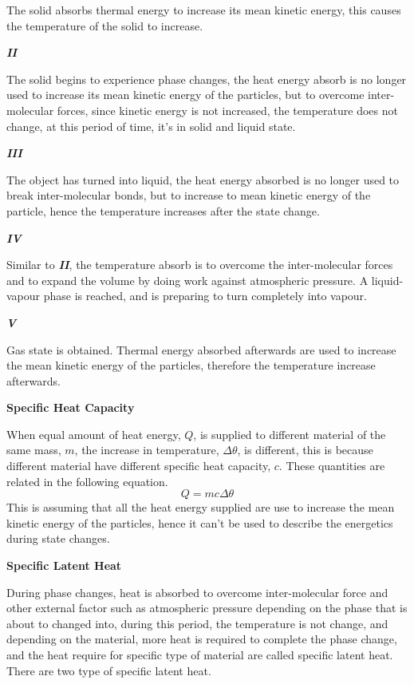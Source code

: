 \documentclass{article}
\begin{document}
The solid absorbs thermal energy to increase its mean kinetic energy, this causes the temperature of the solid to increase. 

\textbf{\textit{II}}

The solid begins to experience phase changes, the heat energy absorb is no longer used to increase its mean kinetic energy of the particles, but to overcome inter-molecular forces, since kinetic energy is not increased, the temperature does not change, at this period of time, it's in solid and liquid state.

\textbf{\textit{III}}

The object has turned into liquid, the heat energy absorbed is no longer used to break inter-molecular bonds, but to increase to mean kinetic energy of the particle, hence the temperature increases after the state change.

\textbf{\textit{IV}}

Similar to \textbf{\textit{II}}, the temperature absorb is to overcome the inter-molecular forces and to expand the volume by doing work against atmospheric pressure. A liquid-vapour phase is reached, and is preparing to turn completely into vapour.

\textbf{\textit{V}}

Gas state is obtained. Thermal energy absorbed afterwards are used to increase the mean kinetic energy of the particles, therefore the temperature increase afterwards.

\begin{flushleft}
 \textbf{Specific Heat Capacity}
\end{flushleft}

When equal amount of heat energy, $Q$, is supplied to different material of the same mass, $m$, the increase in temperature, $\Delta \theta$, is different, this is because different material have different specific heat capacity, $c$. These quantities are related in the following equation.
$$Q=mc\Delta \theta$$
This is assuming that all the heat energy supplied are use to increase the mean kinetic energy of the particles, hence it can't be used to describe the energetics during state changes.

\begin{flushleft}
 \textbf{Specific Latent Heat}
\end{flushleft}

During phase changes, heat is absorbed to overcome inter-molecular force and other external factor such as atmospheric pressure depending on the phase that is about to changed into, during this period, the temperature is not change, and depending on the material, more heat is required to complete the phase change, and the heat require for specific type of material are called specific latent heat. There are two type of specific latent heat. 
\end{document}
